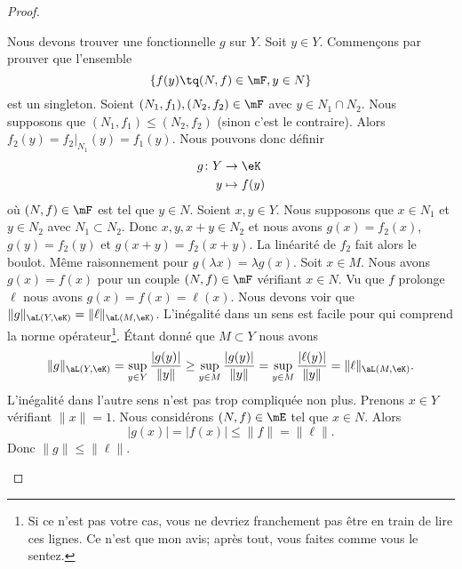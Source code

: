 \begin{proof}
\begin{subproof}
\begin{subproof}
				\spitem[La fonctionnelle]
				Nous devons trouver une fonctionnelle \( g\) sur \( Y\). Soit \( y\in Y\). Commençons par prouver que l'ensemble
				\begin{equation}
					\{ f(y)\tq (N,f)\in \mF, y\in N \}
				\end{equation}
				est un singleton. Soient \( (N_1,f_1), (N_2,f_2)\in\mF\) avec \( y\in N_1\cap N_2\). Nous supposons que \( (N_1,f_1)\leq (N_2,f_2)\) (sinon c'est le contraire). Alors \( f_2(y)=f_2|_{N_1}(y)=f_1(y)\). Nous pouvons donc définir
				\begin{equation}
					\begin{aligned}
						g\colon Y & \to \eK      \\
						y         & \mapsto f(y)
					\end{aligned}
				\end{equation}
				où \( (N,f)\in \mF\) est tel que \( y\in N\).
				Soient \( x,y\in Y\). Nous supposons que \( x\in N_1\) et \( y\in N_2\) avec \( N_1\subset N_2\). Donc \( x,y,x+y\in N_2\) et nous avons \( g(x)=f_2(x)\), \( g(y)=f_2(y)\) et \( g(x+y)=f_2(x+y)\). La linéarité de \( f_2\) fait alors le boulot. Même raisonnement pour \( g(\lambda x)=\lambda g(x)\).
				Soit \( x\in M\). Nous avons \( g(x)=f(x)\) pour un couple \( (N,f)\in \mF\) vérifiant \( x\in N\). Vu que \( f\) prolonge \( \ell\) nous avons \( g(x)=f(x)=\ell(x)\).
				\spitem[Norme de \( g\)]
				Nous devons voir que \( \| g \|_{\aL(Y,\eK)}=\| \ell \|_{\aL(M,\eK)}\). L'inégalité dans un sens est facile pour qui comprend la norme opérateur\footnote{Si ce n'est pas votre cas, vous ne devriez franchement pas être en train de lire ces lignes. Ce n'est que mon avis; après tout, vous faites comme vous le sentez.}. Étant donné que \( M\subset Y\) nous avons
				\begin{equation}
					\| g \|_{\aL(Y,\eK)}=\sup_{y\in Y}\frac{ | g(y) | }{ \| y \| }\geq\sup_{y\in M}\frac{ | g(y) | }{ \| y \| }=\sup_{y\in M}\frac{ | \ell(y) | }{ \| y \| }=\| \ell \|_{\aL(M,\eK)}.
				\end{equation}
				L'inégalité dans l'autre sens n'est pas trop compliquée non plus. Prenons \( x\in Y\) vérifiant \( \| x \|=1\). Nous considérons \( (N,f)\in \mE\) tel que \( x\in N\). Alors
				\begin{equation}
					| g(x) |=| f(x) |\leq\| f \|=\| \ell \|.
				\end{equation}
				Donc \( \| g \|\leq \| \ell \|\).

\end{subproof}
\end{subproof}
\end{proof}
